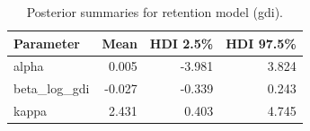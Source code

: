 \begin{table}
\caption{Posterior summaries for retention model (gdi).}
\label{tab:retention_gdi}
\begin{tabular}{lrrr}
\toprule
Parameter & Mean & HDI 2.5\% & HDI 97.5\% \\
\midrule
alpha & 0.005 & -3.981 & 3.824 \\
beta\_log\_gdi & -0.027 & -0.339 & 0.243 \\
kappa & 2.431 & 0.403 & 4.745 \\
\bottomrule
\end{tabular}
\end{table}
